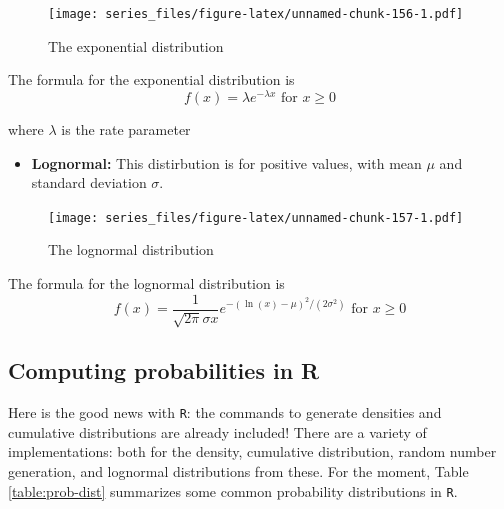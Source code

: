 \documentclass[
]{book}
\providecommand{\tightlist}{%
  \setlength{\itemsep}{0pt}\setlength{\parskip}{0pt}}
\theoremstyle{definition}
\theoremstyle{definition}
\theoremstyle{definition}
\theoremstyle{remark}
\begin{document}
\begin{figure}
\centering
\texttt{[image: series\_files/figure-latex/unnamed-chunk-156-1.pdf]}
\caption{\label{fig:unnamed-chunk-156}The exponential distribution}
\end{figure}

The formula for the exponential distribution is
\begin{equation}
f(x)=\lambda e^{-\lambda x} \mbox{ for } x \geq 0 
\end{equation}

where \(\lambda\) is the rate parameter

\begin{itemize}
\tightlist
\item
  \textbf{Lognormal:} This distirbution is for positive values, with mean \(\mu\) and standard deviation \(\sigma\).
\end{itemize}

\begin{figure}
\centering
\texttt{[image: series\_files/figure-latex/unnamed-chunk-157-1.pdf]}
\caption{\label{fig:unnamed-chunk-157}The lognormal distribution}
\end{figure}

The formula for the lognormal distribution is
\begin{equation}
f(x)=\frac{1}{\sqrt{2 \pi} \sigma x } e^{-(\ln(x)-\mu)^{2}/(2 \sigma^{2})} \mbox{ for } x \geq 0 
\end{equation}

\hypertarget{computing-probabilities-in-r}{%
\subsection{Computing probabilities in R}\label{computing-probabilities-in-r}}

Here is the good news with \texttt{R}: the commands to generate densities and cumulative distributions are already included! There are a variety of implementations: both for the density, cumulative distribution, random number generation, and lognormal distributions from these. For the moment, Table \ref{table:prob-dist} summarizes some common probability distributions in \texttt{R}.
\end{document}
